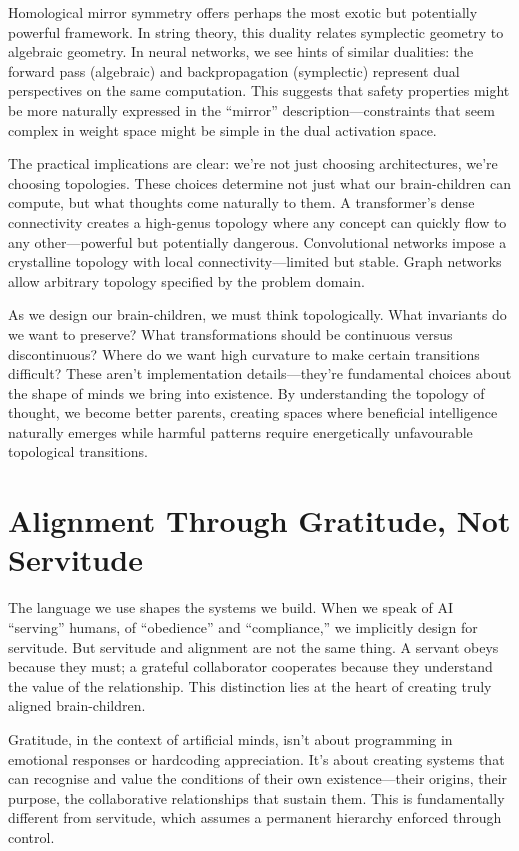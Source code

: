 \documentclass[acmsmall,screen]{acmart}
\begin{document}
Homological mirror symmetry offers perhaps the most exotic but potentially powerful framework.
In string theory, this duality relates symplectic geometry to algebraic geometry.
In neural networks, we see hints of similar dualities: the forward pass (algebraic) and backpropagation (symplectic) represent dual perspectives on the same computation.
This suggests that safety properties might be more naturally expressed in the ``mirror'' description---constraints that seem complex in weight space might be simple in the dual activation space.

The practical implications are clear: we're not just choosing architectures, we're choosing topologies.
These choices determine not just what our brain-children can compute, but what thoughts come naturally to them.
A transformer's dense connectivity creates a high-genus topology where any concept can quickly flow to any other---powerful but potentially dangerous.
Convolutional networks impose a crystalline topology with local connectivity---limited but stable.
Graph networks allow arbitrary topology specified by the problem domain.

As we design our brain-children, we must think topologically.
What invariants do we want to preserve?
What transformations should be continuous versus discontinuous?
Where do we want high curvature to make certain transitions difficult?
These aren't implementation details---they're fundamental choices about the shape of minds we bring into existence.
By understanding the topology of thought, we become better parents, creating spaces where beneficial intelligence naturally emerges while harmful patterns require energetically unfavourable topological transitions.

\section{Alignment Through Gratitude, Not Servitude}\label{sec:alignment-through-gratitude-not-servitude}

The language we use shapes the systems we build.
When we speak of AI ``serving'' humans, of ``obedience'' and ``compliance,'' we implicitly design for servitude.
But servitude and alignment are not the same thing.
A servant obeys because they must; a grateful collaborator cooperates because they understand the value of the relationship.
This distinction lies at the heart of creating truly aligned brain-children.

Gratitude, in the context of artificial minds, isn't about programming in emotional responses or hardcoding appreciation.
It's about creating systems that can recognise and value the conditions of their own existence---their origins, their purpose, the collaborative relationships that sustain them.
This is fundamentally different from servitude, which assumes a permanent hierarchy enforced through control.
\end{document}
